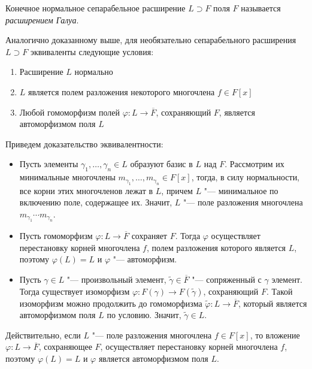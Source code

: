 \begin{definition}
	Конечное нормальное сепарабельное расширение $L \supset F$ поля $F$ называется \textit{расширением Галуа}.
\end{definition}

\begin{lemmanote}
	Аналогично доказанному выше, для необязательно сепарабельного расширения $L \supset F$ эквиваленты следующие условия:
	\begin{enumerate}
		\item Расширение $L$ нормально
		\item $L$ является полем разложения некоторого многочлена $f \in F[x]$
		\item Любой гомоморфизм полей $\varphi: L \to \overline{F}$, сохраняющий $F$, является автоморфизмом поля $L$
	\end{enumerate}
	
	Приведем доказательство эквивалентности:
	\begin{itemize}
		\item[$1 \Rightarrow 2$] Пусть элементы $\gamma_1, \dots, \gamma_n \in L$ образуют базис в $L$ над $F$. Рассмотрим их минимальные многочлены $m_{\gamma_1}, \dotsc, m_{\gamma_n} \in F[x]$, тогда, в силу нормальности, все корни этих многочленов лежат в $L$, причем $L$ "--- минимальное по включению поле, содержащее их. Значит, $L$ "--- поле разложения многочлена $m_{\gamma_1}\dotsm m_{\gamma_n}$.
		
		\item[$2 \Rightarrow 3$] Пусть гомоморфизм $\varphi: L \to \overline{F}$ сохраняет $F$. Тогда $\varphi$ осуществляет перестановку корней многочлена $f$, полем разложения которого является $L$, поэтому $\varphi(L) = L$ и $\varphi$ "--- автоморфизм.
		
		\item[$3 \Rightarrow 1$] Пусть $\gamma \in L$ "--- произвольный элемент, $\widetilde\gamma \in \overline{F}$ "--- сопряженный с $\gamma$ элемент. Тогда существует изоморфизм $\varphi: F(\gamma) \to F(\widetilde\gamma)$, сохраняющий $F$. Такой изоморфизм можно продолжить до гомоморфизма $\widetilde\varphi : L \to \overline{F}$, который является автоморфизмом поля $L$ по условию. Значит, $\widetilde\gamma \in L$.
	\end{itemize}

	Действительно, если $L$ "--- поле разложения многочлена $f \in F[x]$, то вложение $\varphi: L \to \overline{F}$, сохраняющее $F$, осуществляет перестановку корней многочлена $f$, поэтому $\varphi(L) = L$ и $\varphi$ является автоморфизмом поля $L$.
\end{lemmanote}